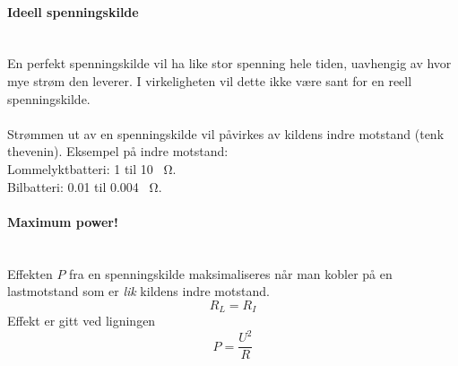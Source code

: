 \paragraph{Ideell spenningskilde} \mbox{} \\
En perfekt spenningskilde vil ha like stor spenning hele tiden,
uavhengig av hvor mye strøm den leverer.
I virkeligheten vil dette ikke være sant for en reell spenningskilde.
\\\\
Strømmen ut av en spenningskilde vil påvirkes av kildens indre motstand
(tenk thevenin).
Eksempel på indre motstand: \\
Lommelyktbatteri: 1 til 10 \SI{}{\ohm}. \\
Bilbatteri: 0.01 til 0.004 \SI{}{\ohm}.



\paragraph{Maximum power!} \mbox{} \\
Effekten $P$ fra en spenningskilde maksimaliseres når man kobler på
en lastmotstand som er \emph{lik} kildens indre motstand.
$$R_L = R_I$$
Effekt er gitt ved ligningen
$$P = \frac{U^2}{R}$$
